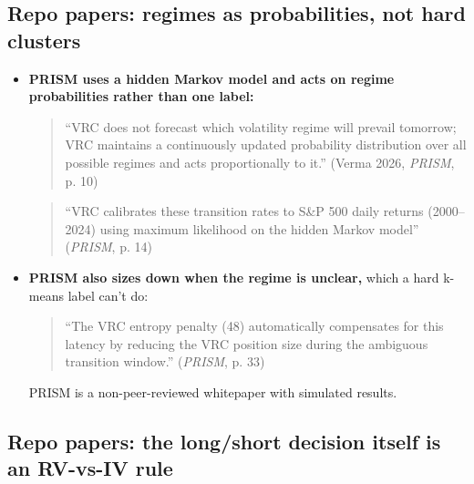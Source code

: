 \documentclass{article}
\begin{document}
\subsection{Repo papers: regimes as probabilities, not hard clusters}

\begin{itemize}

\item \textbf{PRISM uses a hidden Markov model and acts on regime probabilities rather than one label:}

\begin{quote}``VRC does not forecast which volatility regime will prevail tomorrow; VRC maintains a continuously updated probability distribution over all possible regimes and acts proportionally to it.'' (Verma 2026, \emph{PRISM}, p. 10)\end{quote}

\begin{quote}``VRC calibrates these transition rates to S\&P 500 daily returns (2000--2024) using maximum likelihood on the hidden Markov model'' (\emph{PRISM}, p. 14)\end{quote}

\item \textbf{PRISM also sizes down when the regime is unclear,} which a hard k-means label can't do:

\begin{quote}``The VRC entropy penalty (48) automatically compensates for this latency by reducing the VRC position size during the ambiguous transition window.'' (\emph{PRISM}, p. 33)\end{quote}

PRISM is a non-peer-reviewed whitepaper with simulated results.

\end{itemize}

\subsection{Repo papers: the long/\allowbreak{}short decision itself is an RV-vs-IV rule}
\end{document}
